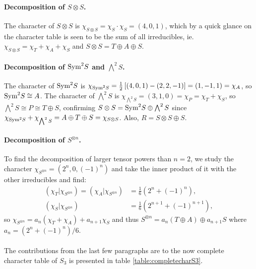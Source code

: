 \begin{example}
	\paragraph{Decomposition of $S \otimes S$.} The character of $S \otimes S$ is $\chi_{S \otimes S} = \chi_S \cdot \chi_S = (4,0,1)$, which by a quick glance on the character table is seen to be the sum of all irreducibles, ie. $\chi_{S \otimes S} = \chi_T + \chi_A + \chi_S$ and $S \otimes S = T \oplus A \oplus S$.
	
	\paragraph{Decomposition of $\text{Sym}^2S$ and $\bigwedge^2S$.} The character of $\text{Sym}^2S$ is $\chi_{\text{Sym}^2S} = \frac{1}{2}\left[ (4,0,1) - (2,2,-1) \right] = (1,-1,1) = \chi_A$, so $\text{Sym}^2S \cong A$. The character of $\bigwedge^2S$ is $\chi_{\bigwedge^2S} = (3,1,0) = \chi_P = \chi_T + \chi_S$, so $\bigwedge^2S \cong P \cong T \oplus S$, confirming $S \otimes S = \text{Sym}^2S \oplus \bigwedge^2S$ since $\chi_{\text{Sym}^2S} + \chi_{\bigwedge^2S} = A \oplus T \oplus S = \chi_{S \otimes S}$. Also, $R = S \otimes S \oplus S$.
	
	\paragraph{Decomposition of $S^{\otimes n}$.}\cite[Exercise 2.7.]{FultonHarris} To find the decomposition of larger tensor powers than $n=2$, we study the character $\chi_{S^{\otimes n}} = (2^n, 0, (-1)^n)$ and take the inner product of it with the other irreducibles and find:
	\begin{align*}
		({\chi_T}|{\chi_{S^{\otimes n}}}) = ({\chi_A}|{\chi_{S^{\otimes n}}}) &= \frac{1}{6}\left(2^n + (-1)^n\right), \\
		({\chi_S}|{\chi_{S^{\otimes n}}}) &= \frac{1}{6}\left(2^{n+1} + (-1)^{n+1}\right), 
	\end{align*}
	so $\chi_{S^{\otimes n}} = a_n (\chi_T + \chi_A) + a_{n+1} \chi_S$ and thus $S^{\otimes n} = a_n (T \oplus A) \oplus a_{n+1} S$ where $a_n = \left(2^n + (-1)^n\right)/6$.
	
	\paragraph{} The contributions from the last few paragraphs are to the now complete character table of $S_3$ is presented in table \ref{table:completecharS3}.
	

\end{example}
